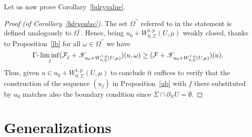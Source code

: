 \documentclass[10pt,reqno]{amsart}
\numberwithin{equation}{section}
\def\R{{\bf R}}
\def\FF{{\mathcal F}}
\def\FFepsi{{\mathcal F}_{j}}
\def\Wsp{W^{1,p}}
\def\Wspo{W_0^{1,p}}
\def\WspoG{W_{0,\Sigma}^{1,p}}
\def\Om{\Omega}
\def\om{\omega}
\def\FFjpsi{{\mathcal F}_j}
\def\FFpsi{{\mathcal F}}
\def\xnc{y}%
\def\UU{\partial_NU}
\begin{document}
Let us now prove Corollary~\ref{bdryvalue}.
\begin{proof}[Proof (of Corollary~\ref{bdryvalue})]
The set $\Om^{\prime\prime}$ referred to in the statement 
is defined analogously to $\Om^{\prime}$. 
Hence, being $u_0+\WspoG(U,\mu)$ weakly closed, thanks to 
Proposition~\ref{lb} for all $\om\in \Om^{\prime\prime}$ we have
$$
\Gamma\hbox{-}\liminf_j(\FFepsi+\mathscr{X}_{u_0+\WspoG(U,\mu)})(u,\om)\geq
(\FF+\mathscr{X}_{u_0+\WspoG(U,\mu)})(u).
$$
Thus, given $u\in u_0+\WspoG(U,\mu)$ to conclude it suffices to verify that 
the construction of the sequence $(u_j)$ in Proposition~\ref{ub} with
$f$ there substituted by $u_0$ matches also the boundary condition
since $\overline{\Sigma}\cap\UU=\emptyset$. 
\end{proof}

\section{Generalizations}\label{genztn}
\end{document}
